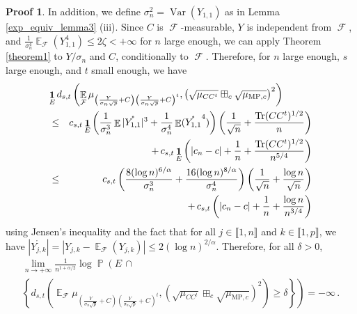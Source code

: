 \documentclass[11pt,a4paper]{article}
\DeclareMathOperator{\E}{\mathbb{E}}
\DeclareMathOperator{\PR}{\mathbb{P}}
\DeclareMathOperator{\FF}{\mathcal{F}}
\DeclareMathOperator{\1}{\mathbf{1}}
\DeclareMathOperator{\Var}{\mathrm{Var}}
\DeclareMathOperator{\Tr}{\mathrm{Tr}}
\newcommand{\mump}{\mu_{\mathrm{MP},c}}
\theoremstyle{definition}
\newtheorem*{Proof}{Proof}
\begin{document}
\begin{Proof}
In addition, we define $\sigma_n^2 = \Var(Y_{1,1})$ as in Lemma \ref{exp_equiv_lemma3} (iii). Since $C$ is $\FF$-measurable, $Y$ is independent from $\FF$, and $\frac{1}{\sigma_n^4} \E_{\FF} (Y_{1,1}^4) \le 2\zeta < +\infty$ for $n$ large enough, we can apply Theorem \ref{theorem1} to $Y/\sigma_n$ and $C$, conditionally to $\FF$. Therefore, for $n$ large enough, $s$ large enough, and $t$ small enough, we have
\begin{eqnarray*}
\lefteqn{  \1_E d_{s,t} \left( \E_{\FF} \mu_{\left( \frac{Y}{\sigma_n \sqrt{p}} + C \right) \left( \frac{Y}{\sigma_n \sqrt{p}} + C \right)^t} , \left( \sqrt{\mu_{CC^t}} \boxplus_c \sqrt{\mump} \right)^2 \right)  } \\
& \le & c_{s,t} \1_E \left( \frac{1}{\sigma_n^3} \E |\mathring{Y_{1,1}}|^3 + \frac{1}{\sigma_n^4} \E(\mathring{Y_{1,1}}^4) \right) \left( \frac{1}{\sqrt{n}} + \frac{\Tr(CC^t)^{1/2}}{n} \right) \\
& & \quad + \, c_{s,t} \1_E \left( |c_n-c| + \frac1n + \frac{\Tr(CC^t)^{1/2}}{n^{5/4}} \right) \\
& \le & c_{s,t} \left( \frac{8(\log n)^{6/\alpha}}{\sigma_n^3} + \frac{16(\log n)^{8/\alpha}}{\sigma_n^4} \right) \left( \frac{1}{\sqrt{n}} + \frac{\log n}{\sqrt{n}} \right) \\
& & \quad + \, c_{s,t} \left( |c_n-c| + \frac1n + \frac{\log n}{n^{3/4}} \right)
\end{eqnarray*}
using Jensen's inequality and the fact that for all $j \in \llbracket 1,n \rrbracket$ and $k \in \llbracket 1,p \rrbracket$, we have $|\mathring{Y_{j,k}}| = |Y_{j,k} - \E_{\FF}(Y_{j,k})| \le 2(\log n)^{2/\alpha}$. Therefore, for all $\delta>0$,
\begin{multline} \label{exp_equiv_eq7}
\lim_{n \to +\infty} \frac{1}{n^{1+\alpha/2}} \log \PR \left( E \, \cap \, \right. \\
\left. \left\{ d_{s,t} \left( \E_{\FF} \mu_{\left( \frac{Y}{\sigma_n \sqrt{p}} + C \right) \left( \frac{Y}{\sigma_n \sqrt{p}} + C \right)^t} , \left( \sqrt{\mu_{CC^t}} \boxplus_c \sqrt{\mump} \right)^2 \right) \ge \delta \right\} \right) = -\infty \, .
\end{multline}


\end{Proof}
\end{document}
